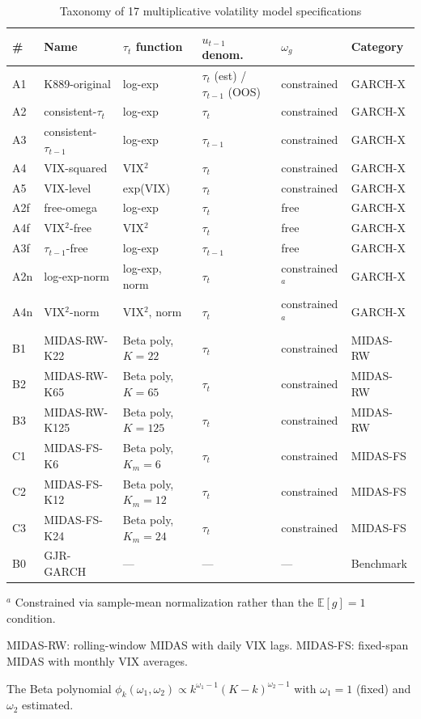 \documentclass[12pt,a4paper]{article}
\newcommand{\E}{\mathbb{E}}
\begin{document}
\begin{table}[H]
\centering
\caption{Taxonomy of 17 multiplicative volatility model specifications}
\label{tab:specs}
\begin{threeparttable}
\small
\begin{tabular}{@{}llllll@{}}
\toprule
\# & Name & $\tau_t$ function & $u_{t-1}$ denom. & $\omega_g$ & Category \\
\midrule
A1 & K889-original & log-exp & $\tau_t$ (est) / $\tau_{t-1}$ (OOS) & constrained & GARCH-X \\
A2 & consistent-$\tau_t$ & log-exp & $\tau_t$ & constrained & GARCH-X \\
A3 & consistent-$\tau_{t-1}$ & log-exp & $\tau_{t-1}$ & constrained & GARCH-X \\
A4 & VIX-squared & VIX$^2$ & $\tau_t$ & constrained & GARCH-X \\
A5 & VIX-level & exp(VIX) & $\tau_t$ & constrained & GARCH-X \\
A2f & free-omega & log-exp & $\tau_t$ & free & GARCH-X \\
A4f & VIX$^2$-free & VIX$^2$ & $\tau_t$ & free & GARCH-X \\
A3f & $\tau_{t-1}$-free & log-exp & $\tau_{t-1}$ & free & GARCH-X \\
A2n & log-exp-norm & log-exp, norm & $\tau_t$ & constrained$^a$ & GARCH-X \\
A4n & VIX$^2$-norm & VIX$^2$, norm & $\tau_t$ & constrained$^a$ & GARCH-X \\
\midrule
B1 & MIDAS-RW-K22 & Beta poly, $K=22$ & $\tau_t$ & constrained & MIDAS-RW \\
B2 & MIDAS-RW-K65 & Beta poly, $K=65$ & $\tau_t$ & constrained & MIDAS-RW \\
B3 & MIDAS-RW-K125 & Beta poly, $K=125$ & $\tau_t$ & constrained & MIDAS-RW \\
C1 & MIDAS-FS-K6 & Beta poly, $K_m=6$ & $\tau_t$ & constrained & MIDAS-FS \\
C2 & MIDAS-FS-K12 & Beta poly, $K_m=12$ & $\tau_t$ & constrained & MIDAS-FS \\
C3 & MIDAS-FS-K24 & Beta poly, $K_m=24$ & $\tau_t$ & constrained & MIDAS-FS \\
\midrule
B0 & GJR-GARCH & --- & --- & --- & Benchmark \\
\bottomrule
\end{tabular}
\begin{tablenotes}
\footnotesize
\item $^a$ Constrained via sample-mean normalization rather than the $\E[g]=1$ condition.
\item MIDAS-RW: rolling-window MIDAS with daily VIX lags. MIDAS-FS: fixed-span MIDAS with monthly VIX averages.
\item The Beta polynomial $\phi_k(\omega_1,\omega_2) \propto k^{\omega_1-1}(K-k)^{\omega_2-1}$ with $\omega_1 = 1$ (fixed) and $\omega_2$ estimated.
\end{tablenotes}
\end{threeparttable}
\end{table}
\end{document}
